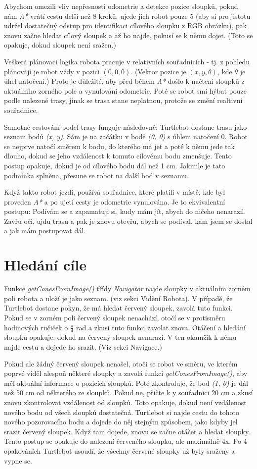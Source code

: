 \documentclass{article}
\begin{document}
Abychom omezili vliv nepřesnosti odometrie a detekce pozice sloupků, pokud nám \textit{A*} vrátí cestu delší než 8 kroků, ujede jich robot pouze 5 (aby si pro jistotu udržel dostatečný odstup pro identifikaci cílového sloupku z RGB obrázku), pak znovu začne hledat cílový sloupek a až ho najde, pokusí se k němu dojet. (Toto se opakuje, dokud sloupek není sražen.)

Veškerá plánovací logika robota pracuje v relativních souřadnicích - tj. z pohledu plánovájí je robot vždy v pozici $(0, 0, 0)$. (Vektor pozice je $(x, y, \theta)$, kde $\theta$ je úhel natočení.) Proto je důležité, aby před během \textit{A*} došlo k načtení sloupků z aktuálního zorného pole a vynulování odometrie. Poté se robot smí hýbat pouze podle nalezené trasy, jinak se trasa stane neplatnou, protože se změní realtivní souřadnice.

Samotné cestování podel trasy funguje následovně: Turtlebot dostane trasu jako seznam bodů \textit{(x, y)}. Sám je na začátku v bodě \textit{(0, 0)} s úhlem natočení 0. Robot se nejprve natočí směrem k bodu, do kterého má jet a poté k němu jede tak dlouho, dokud se jeho vzdálenost k tomuto cílovému bodu zmenšuje. Tento postup opakuje, dokud je od cílového bodu dál než 1 cm. Jakmile je tato podmínka splněna, přesune se robot na další bod v seznamu.

Když takto robot jezdí, používá souřadnice, které platili v místě, kde byl proveden \textit{A*} a po ujetí cesty je odometrie vynulována. Je to ekvivalentní postupu: Podívám se a zapamatuji si, kudy mám jít, abych do ničeho nenarazil. Zavřu oči, ujdu trasu a pak je znovu otevřu, abych se podíval, kam jsem se dostal a jak mám postupovat dál.

\section{Hledání cíle}
Funkce \textit{getConesFromImage()} třídy \textit{Navigator} najde sloupky v aktuálním zorném poli robota a uloží je jako seznam. (viz sekci Vidění Robota).
V případě, že Turtlebot dostane pokyn, že má hledat červený sloupek, zavolá tuto funkci. Pokud se v zorném poli červený sloupek nenachází, otočí se v protisměru hodinových ručiček o $\frac{\pi}{4}$ rad a zkusí tuto funkci zavolat znova. Otáčení a hledání sloupků opakuje, dokud na červený sloupek nenarazí. V ten okamžik k němu najde cestu a dojede ho srazit. (Viz sekci Navigace.)

Pokud ale žádný červený sloupek nenašel, otočí se robot ve směru, ve kterém poprvé viděl alespoň některé sloupky a zavolá funkci \textit{getConesFromImage()}, aby měl aktuální informace o pozicích sloupků. Poté zkontroluje, že bod \textit{(1, 0)} je dál než 50 cm od některého ze sloupků. Pokud ne, přičte k y souřadnici 20 cm a zkusí znovu zkontrolovat vzdálenost od sloupků. Toto opakuje, dokud není vzdálenost nového bodu od všech sloupků dostatečná. Turtlebot si najde cestu do tohoto nového pozorovacího bodu a dojede do něj stejným způsobem, jako kdyby jel srazit červený sloupek. Když tam dojede, znovu se začne otáčet a hledat sloupky. Tento postup se opakuje do nalezení červeného sloupku, ale maximálně 4x. Po 4 opakováních Turtlebot usoudí, že všechny červené sloupky už byly sraženy a vypne se.
\end{document}
